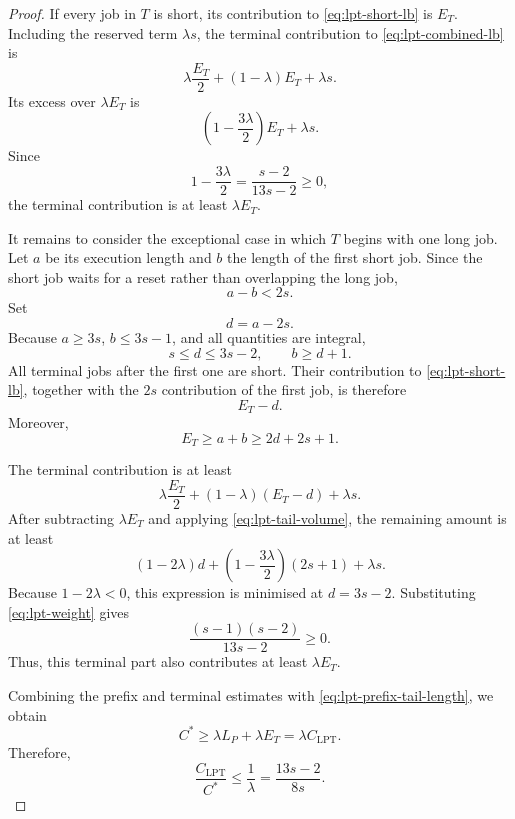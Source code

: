 \documentclass[10pt,a4paper]{amsart}
\begin{document}
\begin{proof}
If every job in \(T\) is short, its contribution to
\eqref{eq:lpt-short-lb} is \(E_T\). Including the reserved term \(\lambda s\),
the terminal contribution to \eqref{eq:lpt-combined-lb} is
\[
\lambda\frac{E_T}{2}+(1-\lambda)E_T+\lambda s.
\]
Its excess over \(\lambda E_T\) is
\[
\left(1-\frac{3\lambda}{2}\right)E_T+\lambda s.
\]
Since
\[
1-\frac{3\lambda}{2}=\frac{s-2}{13s-2}\ge0,
\]
the terminal contribution is at least \(\lambda E_T\).

It remains to consider the exceptional case in which \(T\) begins with one
long job. Let \(a\) be its execution length and \(b\) the length of the first
short job. Since the short job waits for a reset rather than overlapping the
long job,
\[
a-b<2s.
\]
Set
\[
d=a-2s.
\]
Because \(a\ge3s\), \(b\le3s-1\), and all quantities are integral,
\begin{equation}
s\le d\le3s-2,
\qquad
b\ge d+1.
\label{eq:lpt-tail-d}
\end{equation}
All terminal jobs after the first one are short. Their contribution to
\eqref{eq:lpt-short-lb}, together with the \(2s\) contribution of the first
job, is therefore
\[
E_T-d.
\]
Moreover,
\begin{equation}
E_T\ge a+b\ge2d+2s+1.
\label{eq:lpt-tail-volume}
\end{equation}

The terminal contribution is at least
\[
\lambda\frac{E_T}{2}
+(1-\lambda)(E_T-d)
+\lambda s.
\]
After subtracting \(\lambda E_T\) and applying
\eqref{eq:lpt-tail-volume}, the remaining amount is at least
\[
(1-2\lambda)d
+
\left(1-\frac{3\lambda}{2}\right)(2s+1)
+\lambda s.
\]
Because \(1-2\lambda<0\), this expression is minimised at
\(d=3s-2\). Substituting \eqref{eq:lpt-weight} gives
\[
\frac{(s-1)(s-2)}{13s-2}\ge0.
\]
Thus, this terminal part also contributes at least \(\lambda E_T\).

Combining the prefix and terminal estimates with
\eqref{eq:lpt-prefix-tail-length}, we obtain
\[
C^*
\ge
\lambda L_P+\lambda E_T
=
\lambda C_{\mathrm{LPT}}.
\]
Therefore,
\[
\frac{C_{\mathrm{LPT}}}{C^*}
\le
\frac1\lambda
=
\frac{13s-2}{8s}.
\]
\end{proof}
\end{document}
